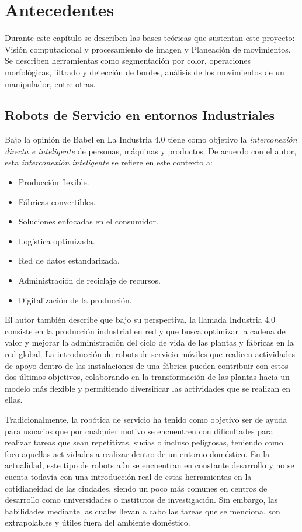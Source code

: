 \chapter{Antecedentes}
Durante este capítulo se describen las bases teóricas que sustentan este proyecto: Visión computacional y procesamiento de imagen y Planeación de movimientos. Se describen herramientas como segmentación por color, operaciones morfológicas, filtrado y detección de bordes, análisis de los movimientos de un manipulador, entre otras.

\section{Robots de Servicio en entornos Industriales}

Bajo la opinión de Babel en \cite{babel_industry_2022} La Industria 4.0 tiene como objetivo la \textit{interconexión directa e inteligente} de  personas, máquinas y productos. De acuerdo con el autor, esta \textit{interconexión inteligente} se refiere en este contexto a:
 \begin{itemize}
     \item Producción flexible.
     \item Fábricas convertibles.
     \item Soluciones enfocadas en el consumidor.
     \item Logística optimizada.
     \item Red de datos estandarizada.
     \item Administración de reciclaje de recursos.
     \item Digitalización de la producción.
 \end{itemize}
 El autor también describe que bajo su perspectiva, la llamada Industria 4.0 consiste en la producción industrial en red y que busca optimizar la cadena de valor y mejorar la administración del ciclo de vida de las plantas y fábricas en la red global. La introducción de robots de servicio móviles que realicen actividades de apoyo dentro de las instalaciones de una fábrica pueden contribuir con estos dos últimos objetivos, colaborando en la transformación de las plantas hacia un modelo más flexible y permitiendo diversificar las actividades que se realizan en ellas.

Tradicionalmente, la robótica de servicio ha tenido como objetivo ser de ayuda para usuarios que por cualquier motivo se encuentren con dificultades para realizar tareas que sean repetitivas, sucias o incluso peligrosas, teniendo como foco aquellas actividades a realizar dentro de un entorno doméstico. En la actualidad, este tipo de robots aún se encuentran en constante desarrollo y no se cuenta todavía con una introducción real de estas herramientas en la cotidianeidad de las ciudades, siendo un poco más comunes en centros de desarrollo como universidades o institutos de investigación. Sin embargo, las habilidades mediante las cuales llevan a cabo las tareas que se menciona, son extrapolables y útiles fuera del ambiente doméstico. 

